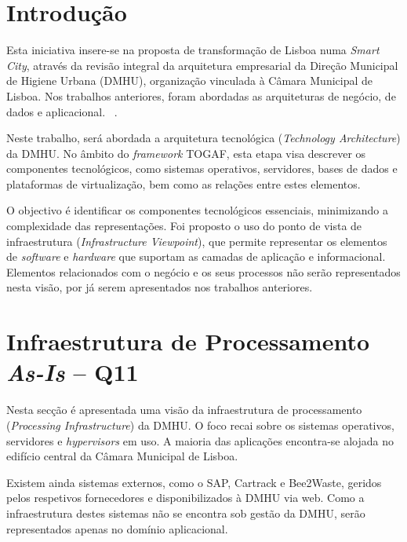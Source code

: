 \documentclass[12pt,a4paper,final]{article}
\begin{document}
    \section{Introdução}

    Esta iniciativa insere-se na proposta de transformação de Lisboa numa \textit{Smart City}, através da revisão integral da arquitetura empresarial da Direção Municipal de Higiene Urbana (DMHU), organização vinculada à Câmara Municipal de Lisboa.
    Nos trabalhos anteriores, foram abordadas as arquiteturas de negócio, de dados e aplicacional. ~\cite{cmllisboa2019}.

    Neste trabalho, será abordada a arquitetura tecnológica (\textit{Technology Architecture}) da DMHU. No âmbito do \textit{framework} TOGAF, esta etapa visa descrever os componentes tecnológicos, como sistemas operativos, servidores, bases de dados e plataformas de virtualização, bem como as relações entre estes elementos.
    ~\cite{opengroup2025}

    O objectivo é identificar os componentes tecnológicos essenciais, minimizando a complexidade das representações.
    Foi proposto o uso do ponto de vista de infraestrutura (\textit{Infrastructure Viewpoint}), que permite representar os elementos de \textit{software} e \textit{hardware} que suportam as camadas de aplicação e informacional.
    Elementos relacionados com o negócio e os seus processos não serão representados nesta visão, por já serem
    apresentados nos trabalhos anteriores.
    ~\cite{visualparadigm2025}

    \section{Infraestrutura de Processamento \textit{As-Is} – Q11}\label{sec:infra-estrutura-de-processamento-textit{as-is}--q11}

    Nesta secção é apresentada uma visão da infraestrutura de processamento (\textit{Processing Infrastructure}) da
    DMHU. O foco recai sobre os sistemas operativos, servidores e \textit{hypervisors} em uso.
    A maioria das aplicações
    encontra-se alojada no edifício central da Câmara Municipal de Lisboa.

    Existem ainda sistemas externos, como o SAP, Cartrack e Bee2Waste, geridos pelos respetivos fornecedores e disponibilizados à DMHU via web.
    Como a infraestrutura destes sistemas não se encontra sob gestão da DMHU, serão representados apenas no domínio aplicacional.
\end{document}

